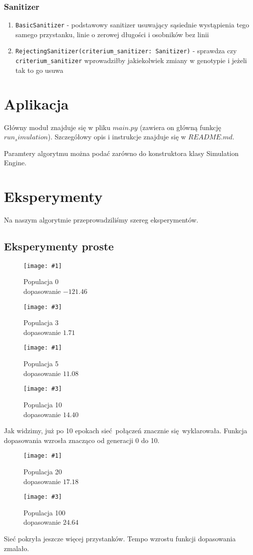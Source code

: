 \documentclass[12pt,a4paper,openright]{mwrep}
\newcommand{\imgsidebyside}[4]{
	\begin{figure}[H]
		\centering
		\begin{minipage}{.45\textwidth}
			\centering
			\texttt{[image: \#1]}
			\caption{#2}
		\end{minipage}%
		\hfill
		\begin{minipage}{.45\textwidth}
			\centering
			\texttt{[image: \#3]}
			\caption{#4}
		\end{minipage}
	\end{figure}
}
\begin{document}
\subsection{Sanitizer}

\begin{enumerate}
    \item \lstinline{BasicSanitizer} - podstawowy sanitizer usuwający sąsiednie wystąpienia tego samego przystanku, linie o zerowej długości i osobników bez linii
    \item \lstinline{RejectingSanitizer(criterium_sanitizer: Sanitizer)} - sprawdza czy \lstinline{criterium_sanitizer} wprowadziłby jakiekolwiek zmiany w genotypie i jeżeli tak to go usuwa
\end{enumerate}

\chapter{Aplikacja}

Główny moduł znajduje się w pliku $main.py$ (zawiera on główną funkcję $run_simulation$). Szczegółowy opis i instrukcje znajduje się w $README.md$. 

Paramtery algorytmu można podać zarówno do konstruktora klasy Simulation Engine.

\chapter{Eksperymenty}
Na naszym algorytmie przeprowadziliśmy szereg eksperymentów.

\section{Eksperymenty proste}
\imgsidebyside{test1/0}{Populacja 0\\ dopasowanie $-121.46$}{test1/3}{Populacja 3\\ dopasowanie $1.71$}
\imgsidebyside{test1/5}{Populacja 5\\ dopasowanie $11.08$}{test1/10}{Populacja 10\\ dopasowanie $14.40$}
Jak widzimy, już po 10 epokach sieć połączeń znacznie się wyklarowała. Funkcja dopasowania wzrosła znacząco od generacji 0 do 10.

\imgsidebyside{test1/20}{Populacja 20\\ dopasowanie $17.18$}{test1/100}{Populacja 100\\ dopasowanie $24.64$}
Sieć pokryła jeszcze więcej przystanków. Tempo wzrostu funkcji dopasowania zmalało.
\end{document}
